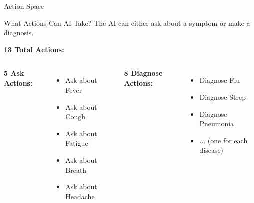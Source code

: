 \documentclass[aspectratio=169]{beamer}
\begin{document}
\begin{frame}{Action Space}
    \begin{block}{What Actions Can AI Take?}
        The AI can either ask about a symptom or make a diagnosis.
    \end{block}
    
    \vspace{0.3cm}
    
    \textbf{13 Total Actions:}\par\vspace{0.3cm}

    \begin{columns}

        \textbf{5 Ask Actions:}
        \begin{itemize}
            \item Ask about Fever
            \item Ask about Cough
            \item Ask about Fatigue
            \item Ask about Breath
            \item Ask about Headache
        \end{itemize}
        
        \textbf{8 Diagnose Actions:}
        \begin{itemize}
            \item Diagnose Flu
            \item Diagnose Strep
            \item Diagnose Pneumonia
            \item ... (one for each disease)
        \end{itemize}
    \end{columns}
\end{frame}
\end{document}
